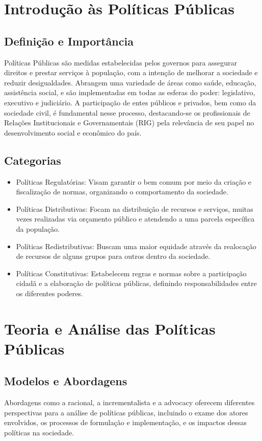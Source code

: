\documentclass[
   article,       
   12pt,          
   oneside,       
   a4paper,       
   english,       
   brazil,        
   sumario=tradicional
   ]{abntex2}
\begin{document}
\section{Introdução às Políticas Públicas}
\subsection{Definição e Importância}
Políticas Públicas são medidas estabelecidas pelos governos para assegurar direitos e prestar serviços à população, com a intenção de melhorar a sociedade e reduzir desigualdades. Abrangem uma variedade de áreas como saúde, educação, assistência social, e são implementadas em todas as esferas do poder: legislativo, executivo e judiciário. A participação de entes públicos e privados, bem como da sociedade civil, é fundamental nesse processo, destacando-se os profissionais de Relações Institucionais e Governamentais (RIG) pela relevância de seu papel no desenvolvimento social e econômico do país.

\subsection{Categorias}
\begin{itemize}
    \item Políticas Regulatórias: Visam garantir o bem comum por meio da criação e fiscalização de normas, organizando o comportamento da sociedade.
    \item Políticas Distributivas: Focam na distribuição de recursos e serviços, muitas vezes realizadas via orçamento público e atendendo a uma parcela específica da população.
    \item Políticas Redistributivas: Buscam uma maior equidade através da realocação de recursos de alguns grupos para outros dentro da sociedade.
    \item Políticas Constitutivas: Estabelecem regras e normas sobre a participação cidadã e a elaboração de políticas públicas, definindo responsabilidades entre os diferentes poderes.
\end{itemize}

\section{Teoria e Análise das Políticas Públicas}
\subsection{Modelos e Abordagens}
Abordagens como a racional, a incrementalista e a advocacy oferecem diferentes perspectivas para a análise de políticas públicas, incluindo o exame dos atores envolvidos, os processos de formulação e implementação, e os impactos dessas políticas na sociedade.
\end{document}
